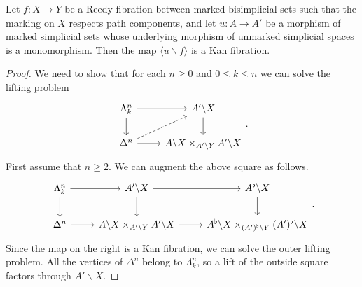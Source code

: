 \documentclass[main.tex]{subfiles}
\begin{document}
\begin{proposition}
  \label{prop:cartesian_marking_respects_path_components}
  Let $f\colon X \to Y$ be a Reedy fibration between marked bisimplicial sets such that the marking on $X$ respects path components, and let $u\colon A \to A'$ be a morphism of marked simplicial sets whose underlying morphism of unmarked simplicial spaces is a monomorphism. Then the map $\langle u \backslash f \rangle$ is a Kan fibration.
\end{proposition}
\begin{proof}
  We need to show that for each $n \geq 0$ and $0 \leq k \leq n$ we can solve the lifting problem
  \begin{equation*}
    \begin{tikzcd}
      \Lambda^{n}_{k}
      \arrow[r]
      \arrow[d]
      & A' \backslash X
      \arrow[d]
      \\
      \Delta^{n}
      \arrow[r]
      \arrow[ur, dashed]
      & A \backslash X \times_{A' \backslash Y} A' \backslash X
    \end{tikzcd}.
  \end{equation*}
  First assume that $n \geq 2$. We can augment the above square as follows.
  \begin{equation*}
    \begin{tikzcd}
      \Lambda^{n}_{k}
      \arrow[r]
      \arrow[d]
      & A' \backslash X
      \arrow[r]
      \arrow[d]
      & A^{\flat} \backslash X
      \arrow[d]
      \\
      \Delta^{n}
      \arrow[r]
      & A \backslash X \times_{A' \backslash Y} A' \backslash X
      \arrow[r]
      & A^{\flat} \backslash X \times_{(A')^{\flat} \backslash Y} (A')^{\flat} \backslash X
    \end{tikzcd}.
  \end{equation*}
  Since the map on the right is a Kan fibration, we can solve the outer lifting problem. All the vertices of $\Delta^{n}$ belong to $\Lambda^{n}_{k}$, so a lift of the outside square factors through $A' \backslash X$.


\end{proof}
\end{document}
